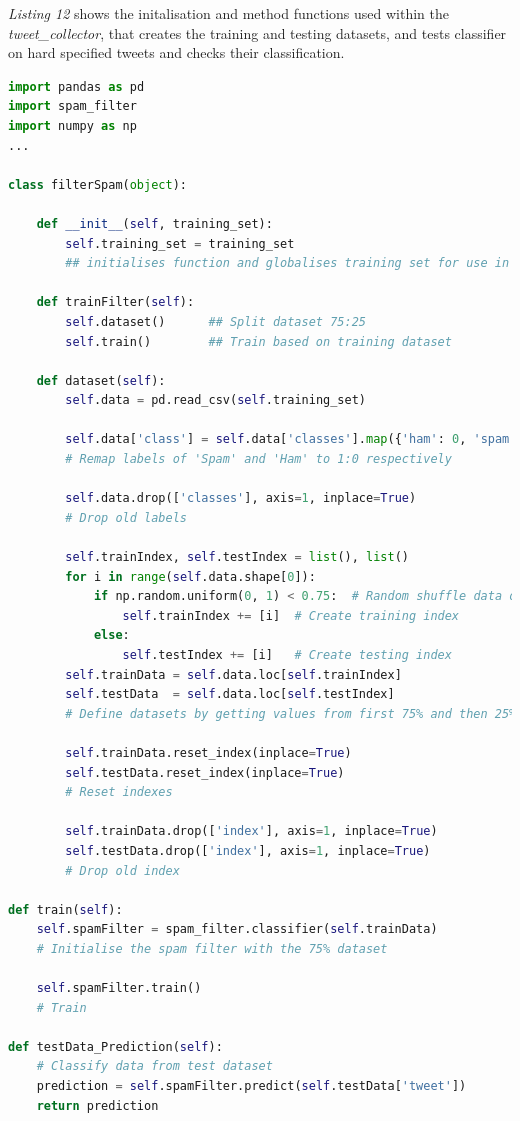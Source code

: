 \documentclass[oneside, 12pt]{article}
\begin{document}
			\textit{Listing 12} shows the initalisation and method functions used within the \textit{tweet\_collector}, that creates the training and testing datasets, and tests classifier on hard specified tweets and checks their classification.
			
			\begin{lstlisting}[language=python, caption=Spam filter training Class - \textit{tweet\_collector.py}]
import pandas as pd
import spam_filter
import numpy as np
...			
			
class filterSpam(object):
				
	def __init__(self, training_set):
		self.training_set = training_set	
		## initialises function and globalises training set for use in every function where needed
				
	def trainFilter(self):
		self.dataset()		## Split dataset 75:25
		self.train()		## Train based on training dataset
				
	def dataset(self):
		self.data = pd.read_csv(self.training_set)
				
		self.data['class'] = self.data['classes'].map({'ham': 0, 'spam': 1})
		# Remap labels of 'Spam' and 'Ham' to 1:0 respectively
				
		self.data.drop(['classes'], axis=1, inplace=True)
		# Drop old labels
				
		self.trainIndex, self.testIndex = list(), list()
		for i in range(self.data.shape[0]):
			if np.random.uniform(0, 1) < 0.75:	# Random shuffle data of 75%
				self.trainIndex += [i]	# Create training index
			else:
				self.testIndex += [i]	# Create testing index
		self.trainData = self.data.loc[self.trainIndex]
		self.testData  = self.data.loc[self.testIndex]
		# Define datasets by getting values from first 75% and then 25%
				
		self.trainData.reset_index(inplace=True)
		self.testData.reset_index(inplace=True)		
		# Reset indexes
				
		self.trainData.drop(['index'], axis=1, inplace=True)
		self.testData.drop(['index'], axis=1, inplace=True)
		# Drop old index
				
def train(self):
	self.spamFilter = spam_filter.classifier(self.trainData)
	# Initialise the spam filter with the 75% dataset
				
	self.spamFilter.train()
	# Train
				
def testData_Prediction(self):
	# Classify data from test dataset
	prediction = self.spamFilter.predict(self.testData['tweet'])	
	return prediction
				

\end{lstlisting}
\end{document}
